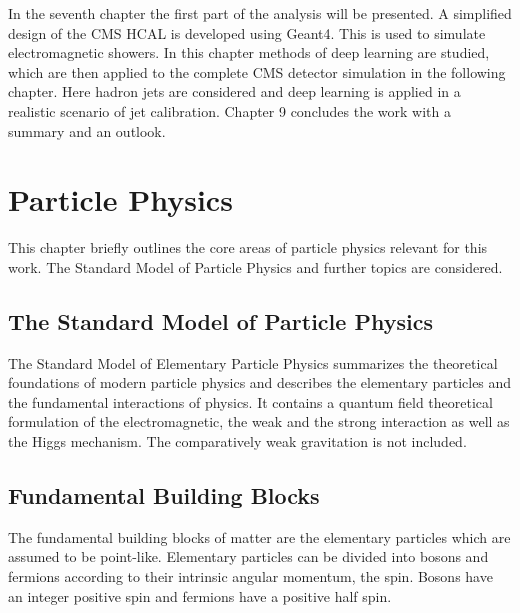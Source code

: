 \documentclass[12pt, a4paper]{thesis}
\begin{document}
In the seventh chapter the first part of the analysis will be
presented. A simplified design of the CMS HCAL is developed using
Geant4. This is used to simulate electromagnetic showers. In this
chapter methods of deep learning are studied, which are then applied
to the complete CMS detector simulation in the following chapter. Here
hadron jets are considered and deep learning is applied in a realistic
scenario of jet calibration. Chapter 9 concludes the work with a
summary and an outlook.

\chapter{Particle Physics}
\label{sec:orgcd2d7c7}

This chapter briefly outlines the core areas of particle
physics relevant for this work. The Standard Model of
Particle Physics and further topics are considered.

\section{The Standard Model of Particle Physics}
\label{sec:org862e92f}

The Standard Model of Elementary Particle Physics summarizes the
theoretical foundations of modern particle physics and describes the
elementary particles and the fundamental interactions of physics. It
contains a quantum field theoretical formulation of the
electromagnetic, the weak and the strong interaction as well as the
Higgs mechanism. The comparatively weak gravitation is not included.

\section{Fundamental Building Blocks}
\label{sec:org4008fdf}

The fundamental building blocks of matter are the elementary particles
which are assumed to be point-like. Elementary particles can be
divided into bosons and fermions according to their intrinsic angular
momentum, the spin. Bosons have an integer positive spin and fermions
have a positive half spin.
\end{document}

